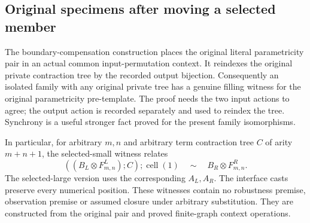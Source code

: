 \par{}
\par{}
\par{}
\par{}
\par{}
\par{}
\par{}
\par{}
\par{}
%

\subsection{Original specimens after moving a selected member}
The boundary-compensation construction places the original literal
parametricity pair in an actual common input-permutation context. It
reindexes the original private contraction tree by the recorded output
bijection. Consequently an isolated family with any original private tree
has a genuine filling witness for the original parametricity pre-template.
The proof needs the two input actions to agree; the output action is
recorded separately and used to reindex the tree. Synchrony is a useful
stronger fact proved for the present family isomorphisms.

In particular, for arbitrary $m,n$ and arbitrary term contraction tree
$C$ of arity $m+n+1$, the selected-small witness relates
\[
 ((B_L\otimes F^L_{m,n});C);\operatorname{cell}(1)
       \quad\sim\quad B_R\otimes F^R_{m,n}.
\]
The selected-large version uses the corresponding $A_L,A_R$. The interface
casts preserve every numerical position. These witnesses contain no
robustness premise, observation premise or assumed closure under arbitrary
substitution. They are constructed from the original pair and proved
finite-graph context operations.

